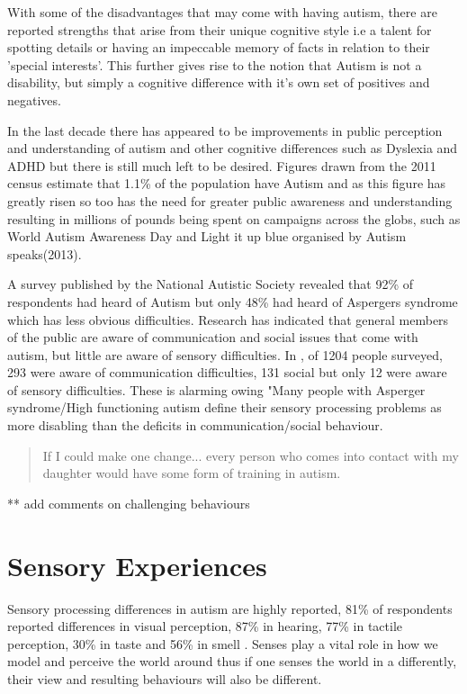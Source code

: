 \documentclass[11pt]{report}
\begin{document}
With some of the disadvantages that may come with having autism, there are reported strengths that arise from their unique cognitive style i.e a talent for spotting details\cite{bayes} or having an impeccable memory of facts in relation to their 'special interests'. This further gives rise to the notion that Autism is not a disability, but simply a cognitive difference with it's own set of positives and negatives. 

In the last decade there has appeared to be improvements in public perception and understanding of autism and other cognitive differences such as Dyslexia and ADHD but there is still much left to be desired. Figures drawn from the 2011 census estimate that 1.1\% of the population have Autism\cite{nas} and as this figure has greatly risen\cite{increasingprevalence} so too has the need for greater public awareness and understanding\cite{autism_awareness} resulting in millions of pounds being spent on campaigns across the globs, such as World Autism Awareness Day and Light it up blue organised by Autism speaks(2013)\cite{autism_awareness}. 

A survey published by the National Autistic Society revealed that 92\% of respondents had heard of Autism but only 48\% had heard of Aspergers syndrome which has less obvious difficulties. Research has indicated that general members of the public are aware of communication and social issues that come with autism\cite{autismmisconception}, but little are aware of sensory difficulties\cite{autism_awareness}. In \cite{autism_awareness}, of 1204 people surveyed, 293 were aware of communication difficulties, 131 social but only 12 were aware of sensory difficulties. These is alarming owing "Many people with Asperger syndrome/High functioning autism define their sensory processing problems as more disabling than the deficits in communication/social behaviour\cite{olgab}.

\begin{quote}
If I could make one change... every person who comes into contact with my daughter would have some form of training in autism.\cite{nasschool}
\end{quote}

** add comments on challenging behaviours

\section{Sensory Experiences}
Sensory processing differences in autism are highly reported, 81\% of respondents reported differences in visual perception, 87\% in hearing, 77\% in tactile perception, 30\% in taste and 56\% in smell \cite{sensory_leisure}. Senses play a vital role in how we model and perceive the world around thus if one senses the world in a differently, their view and resulting behaviours will also be different. 
\end{document}
